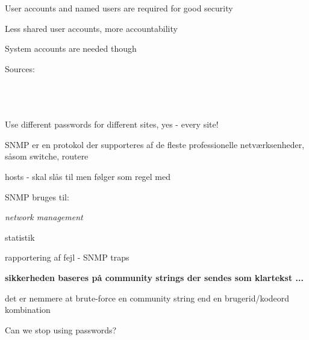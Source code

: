 \documentclass[Screen16to9,17pt]{foils}
\begin{document}

\begin{list1}
\item User accounts and named users are required for good security
\item Less shared user accounts, more accountability
\item System accounts are needed though
\end{list1}





 Sources:\\
{\footnotesize{}\\
\\
\\
}

\vskip 5mm
\centerline{Use different passwords for different sites, yes - every site!}


\begin{list1}
\item SNMP er en protokol der supporteres af de fleste professionelle
  netværksenheder, såsom switche, routere
\item hosts - skal slås til men følger som regel med
\item SNMP bruges til:
  \begin{list2}
    \item \emph{network management}
    \item statistik
    \item rapportering af fejl - SNMP traps
  \end{list2}
\item {\bfseries sikkerheden baseres på community strings der sendes
    som klartekst ...}
\item det er nemmere at brute-force en community string end en
  brugerid/kodeord kombination
\end{list1}



Can we stop using passwords?
\end{document}
